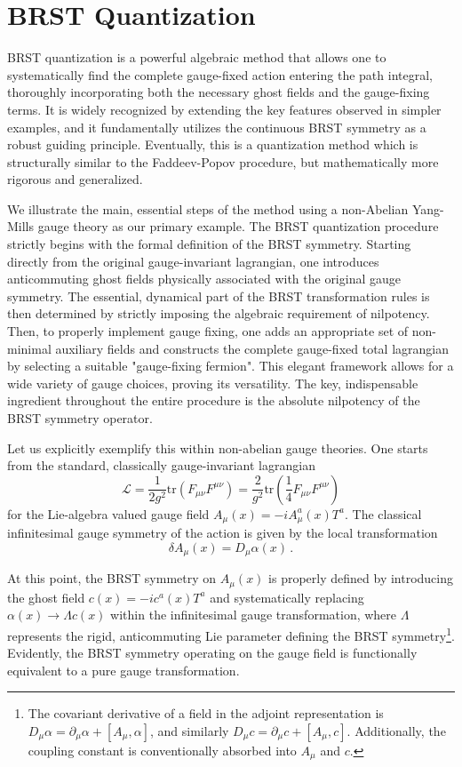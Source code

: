 \section{BRST Quantization}

BRST quantization is a powerful algebraic method that allows one to systematically find the complete gauge-fixed action entering the path integral, thoroughly incorporating both the necessary ghost fields and the gauge-fixing terms. It is widely recognized by extending the key features observed in simpler examples, and it fundamentally utilizes the continuous BRST symmetry as a robust guiding principle. Eventually, this is a quantization method which is structurally similar to the Faddeev-Popov procedure, but mathematically more rigorous and generalized.

We illustrate the main, essential steps of the method using a non-Abelian Yang-Mills gauge theory as our primary example. The BRST quantization procedure strictly begins with the formal definition of the BRST symmetry. Starting directly from the original gauge-invariant lagrangian, one introduces anticommuting ghost fields physically associated with the original gauge symmetry. The essential, dynamical part of the BRST transformation rules is then determined by strictly imposing the algebraic requirement of nilpotency. Then, to properly implement gauge fixing, one adds an appropriate set of non-minimal auxiliary fields and constructs the complete gauge-fixed total lagrangian by selecting a suitable "gauge-fixing fermion". This elegant framework allows for a wide variety of gauge choices, proving its versatility. The key, indispensable ingredient throughout the entire procedure is the absolute nilpotency of the BRST symmetry operator.

Let us explicitly exemplify this within non-abelian gauge theories. One starts from the standard, classically gauge-invariant lagrangian
\begin{equation} \label{eq:45}
    \mathcal{L} = \frac{1}{2g^2}\text{tr}(F_{\mu\nu}F^{\mu\nu}) = \frac{2}{g^2}\text{tr}\left(\frac{1}{4}F_{\mu\nu}F^{\mu\nu}\right)
\end{equation}
for the Lie-algebra valued gauge field \(A_\mu(x) = -iA_\mu^a(x)T^a\). The classical infinitesimal gauge symmetry of the action is given by the local transformation
\begin{equation} \label{eq:46}
    \delta A_\mu(x) = D_\mu\alpha(x) \, .
\end{equation}

At this point, the BRST symmetry on \(A_\mu(x)\) is properly defined by introducing the ghost field \(c(x) = -ic^a(x)T^a\) and systematically replacing \(\alpha(x) \rightarrow \Lambda c(x)\) within the infinitesimal gauge transformation, where \(\Lambda\) represents the rigid, anticommuting Lie parameter defining the BRST symmetry\footnote{The covariant derivative of a field in the adjoint representation is \(D_\mu \alpha = \partial_\mu \alpha + [A_\mu, \alpha]\), and similarly \(D_\mu c = \partial_\mu c + [A_\mu, c]\). Additionally, the coupling constant is conventionally absorbed into \(A_\mu\) and \(c\).}. Evidently, the BRST symmetry operating on the gauge field is functionally equivalent to a pure gauge transformation.

